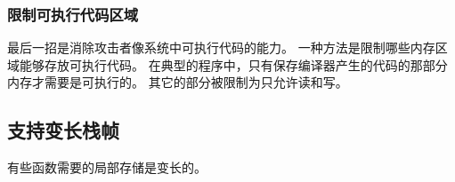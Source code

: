 {{        \subsubsection{限制可执行代码区域}
        {
            最后一招是消除攻击者像系统中可执行代码的能力。
            一种方法是限制哪些内存区域能够存放可执行代码。
            在典型的程序中，只有保存编译器产生的代码的那部分内存才需要是可执行的。
            其它的部分被限制为只允许读和写。
        }
    }

    \subsection{支持变长栈帧}
    {
        有些函数需要的局部存储是变长的。
    }
}
